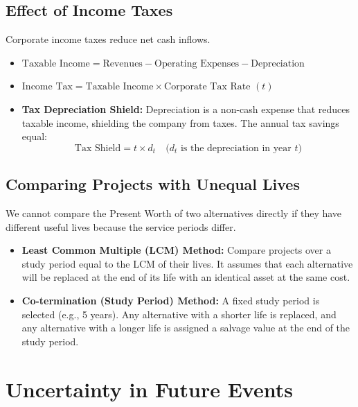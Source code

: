 \documentclass[12pt,a4paper]{article}
\begin{document}
\subsection{Effect of Income Taxes}
Corporate income taxes reduce net cash inflows.
\begin{itemize}[leftmargin=*, itemsep=4pt]
  \item $\text{Taxable Income} = \text{Revenues} - \text{Operating Expenses} - \text{Depreciation}$
  \item $\text{Income Tax} = \text{Taxable Income} \times \text{Corporate Tax Rate } (t)$
  \item \textbf{Tax Depreciation Shield:} Depreciation is a non-cash expense that reduces taxable income, shielding the company from taxes. The annual tax savings equal:
    \begin{equation}
      \text{Tax Shield} = t \times d_t \quad \text{($d_t$ is the depreciation in year $t$)}
    \end{equation}
\end{itemize}

\subsection{Comparing Projects with Unequal Lives}
We cannot compare the Present Worth of two alternatives directly if they have different useful lives because the service periods differ.
\begin{itemize}[leftmargin=*, itemsep=6pt]
  \item \textbf{Least Common Multiple (LCM) Method:} Compare projects over a study period equal to the LCM of their lives. It assumes that each alternative will be replaced at the end of its life with an identical asset at the same cost.
  \item \textbf{Co-termination (Study Period) Method:} A fixed study period is selected (e.g., 5 years). Any alternative with a shorter life is replaced, and any alternative with a longer life is assigned a salvage value at the end of the study period.
\end{itemize}

\section{Uncertainty in Future Events}
\end{document}
